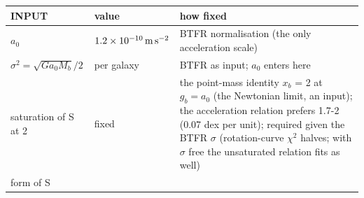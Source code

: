 \documentclass[
  10pt,
]{article}
\begin{document}
\begin{longtable}[]{@{}lll@{}}
\toprule
\begin{minipage}[b]{0.24\columnwidth}\raggedright
INPUT\strut
\end{minipage} & \begin{minipage}[b]{0.20\columnwidth}\raggedright
value\strut
\end{minipage} & \begin{minipage}[b]{0.50\columnwidth}\raggedright
how fixed\strut
\end{minipage}\tabularnewline
\midrule
\endhead
\begin{minipage}[t]{0.24\columnwidth}\raggedright
$a_0$\strut
\end{minipage} & \begin{minipage}[t]{0.20\columnwidth}\raggedright
$1.2\times10^{-10}\,{\rm m\,s^{-2}}$\strut
\end{minipage} & \begin{minipage}[t]{0.50\columnwidth}\raggedright
BTFR normalisation (the only acceleration scale)\strut
\end{minipage}\tabularnewline
\begin{minipage}[t]{0.24\columnwidth}\raggedright
$\sigma^2=\sqrt{G a_0 M_b}/2$\strut
\end{minipage} & \begin{minipage}[t]{0.20\columnwidth}\raggedright
per galaxy\strut
\end{minipage} & \begin{minipage}[t]{0.50\columnwidth}\raggedright
BTFR as input; $a_0$ enters here\strut
\end{minipage}\tabularnewline
\begin{minipage}[t]{0.24\columnwidth}\raggedright
saturation of S at 2\strut
\end{minipage} & \begin{minipage}[t]{0.20\columnwidth}\raggedright
fixed\strut
\end{minipage} & \begin{minipage}[t]{0.50\columnwidth}\raggedright
the point-mass identity $x_b$ = 2 at $g_b=a_0$ (the Newtonian limit, an input); the acceleration relation prefers 1.7-2 (0.07 dex per unit); required given the BTFR $\sigma$ (rotation-curve $\chi^2$ halves; with $\sigma$ free the unsaturated relation fits as well)\strut
\end{minipage}\tabularnewline
\begin{minipage}[t]{0.24\columnwidth}\raggedright
form of S\strut
\end{minipage} & \begin{minipage}[t]{0.20\columnwidth}\raggedright

\end{minipage}
\end{longtable}
\end{document}
